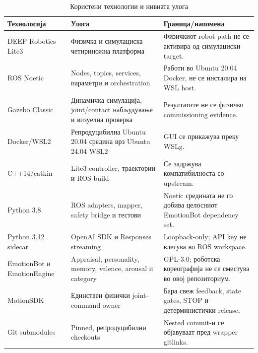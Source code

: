 \begin{table}[htbp]
\centering
\caption{Користени технологии и нивната улога}
\label{tab:technologies}
\small
\begin{tabularx}{\textwidth}{L{0.22\textwidth}YY}
\toprule
\textbf{Технологија} & \textbf{Улога} & \textbf{Граница/напомена} \\
\midrule
DEEP Robotics Lite3 & Физичка и симулациска четириножна платформа & Физичкиот robot path не се активира од симулациски target. \\
ROS Noetic & Nodes, topics, services, параметри и orchestration & Работи во Ubuntu 20.04 Docker, не се инсталира на WSL host. \\
Gazebo Classic & Динамичка симулација, joint/contact набљудување и визуелна проверка & Резултатите не се физичко commissioning evidence. \\
Docker/WSL2 & Репродуцибилна Ubuntu 20.04 средина врз Ubuntu 24.04 WSL2 & GUI се прикажува преку WSLg. \\
C++14/catkin & Lite3 controller, траектории и ROS build & Се задржува компатибилноста со upstream. \\
Python 3.8 & ROS adapters, mapper, safety bridge и тестови & Noetic средината не го добива целосниот EmotionBot dependency set. \\
Python 3.12 sidecar & OpenAI SDK и Responses streaming & Loopback-only; API key не влегува во ROS workspace. \\
EmotionBot и EmotionEngine & Appraisal, personality, memory, valence, arousal и category & GPL-3.0; роботска кореографија не се сместува во овој репозиториум. \\
MotionSDK & Единствен физички joint-command owner & Бара свеж feedback, state gates, STOP и детерминистички release. \\
Git submodules & Pinned, репродуцибилни checkouts & Nested commit-и се објавуваат пред wrapper gitlinks. \\
\bottomrule
\end{tabularx}
\end{table}
